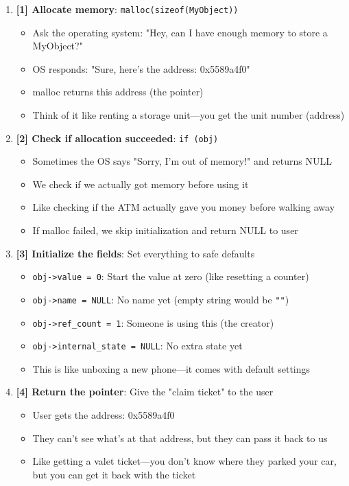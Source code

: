 \begin{enumerate}
    \item \textbf{[1] Allocate memory}: \texttt{malloc(sizeof(MyObject))}
    \begin{itemize}
        \item Ask the operating system: "Hey, can I have enough memory to store a MyObject?"
        \item OS responds: "Sure, here's the address: 0x5589a4f0"
        \item malloc returns this address (the pointer)
        \item Think of it like renting a storage unit---you get the unit number (address)
    \end{itemize}

    \item \textbf{[2] Check if allocation succeeded}: \texttt{if (obj)}
    \begin{itemize}
        \item Sometimes the OS says "Sorry, I'm out of memory!" and returns NULL
        \item We check if we actually got memory before using it
        \item Like checking if the ATM actually gave you money before walking away
        \item If malloc failed, we skip initialization and return NULL to user
    \end{itemize}

    \item \textbf{[3] Initialize the fields}: Set everything to safe defaults
    \begin{itemize}
        \item \texttt{obj->value = 0}: Start the value at zero (like resetting a counter)
        \item \texttt{obj->name = NULL}: No name yet (empty string would be \texttt{""})
        \item \texttt{obj->ref\_count = 1}: Someone is using this (the creator)
        \item \texttt{obj->internal\_state = NULL}: No extra state yet
        \item This is like unboxing a new phone---it comes with default settings
    \end{itemize}

    \item \textbf{[4] Return the pointer}: Give the "claim ticket" to the user
    \begin{itemize}
        \item User gets the address: 0x5589a4f0
        \item They can't see what's at that address, but they can pass it back to us
        \item Like getting a valet ticket---you don't know where they parked your car, but you can get it back with the ticket
    \end{itemize}
\end{enumerate}

